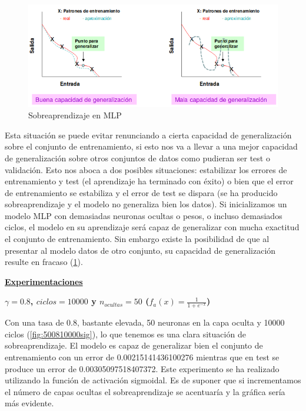 \documentclass[11pt,spanish,listoffigures,listoftables]{workluis}
\begin{document}
\begin{figure}[H]
\centering
\includegraphics[scale=0.5]{sobreaprendizaje}
\caption{Sobreaprendizaje en MLP \cite{MLP}}\label{fig:sobreaprendizaje}
\end{figure}

\par Esta situación se puede evitar renunciando a cierta capacidad de generalización sobre el conjunto de entrenamiento, si esto nos va a llevar a una mejor capacidad de generalización sobre otros conjuntos de datos como pudieran ser test o validación. Esto nos aboca a dos posibles situaciones: estabilizar los errores de entrenamiento y test (el aprendizaje ha terminado con éxito) o bien que el error de entrenamiento se estabiliza y el error de test se dispara (se ha producido sobreaprendizaje y el modelo no generaliza bien los datos). Si inicializamos un modelo MLP con demasiadas neuronas ocultas o pesos, o incluso demasiados ciclos, el modelo en su aprendizaje será capaz de generalizar con mucha exactitud el conjunto de entrenamiento. Sin embargo existe la posibilidad de que al presentar al modelo datos de otro conjunto, su capacidad de generalización resulte en fracaso (\ref{fig:sobreaprendizaje}). 

\par \underline{\textbf{Experimentaciones}}

\par \textbf{$\gamma = 0.8$, $ciclos = 10000$ y $n_{ocultas} = 50$ ($f_{a}(x) = \frac{1}{1+e^{-x}}$)}

\par Con una tasa de 0.8, bastante elevada, 50 neuronas en la capa oculta y 10000 ciclos (\ref{fig:500810000sig}), lo que tenemos es una clara situación de sobreaprendizaje. El modelo es capaz de generalizar bien el conjunto de entrenamiento con un error de 0.00215141436100276 mientras que en test se produce un error de 0.00305097518407372. Este experimento se ha realizado utilizando la función de activación sigmoidal. Es de suponer que si incrementamos el número de capas ocultas el sobreaprendizaje se acentuaría y la gráfica sería más evidente.
\end{document}
